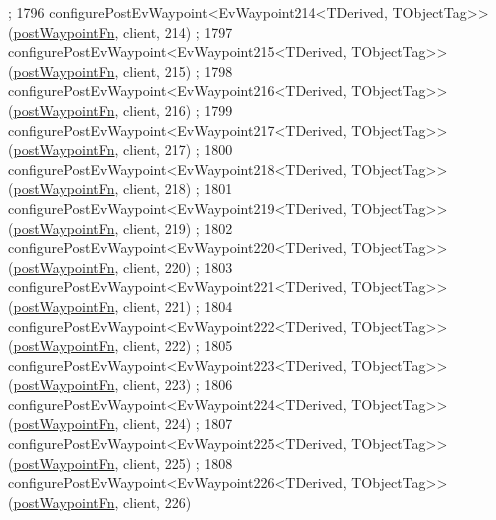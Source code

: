 \begin{DoxyCode}
      ;
1796     configurePostEvWaypoint<EvWaypoint214<TDerived, TObjectTag>>(\hyperlink{classmove__base__z__client_1_1WaypointEventDispatcher_acc538eb7506c13f7cca2268a1742dadd}{postWaypointFn}, client, 214)
      ;
1797     configurePostEvWaypoint<EvWaypoint215<TDerived, TObjectTag>>(\hyperlink{classmove__base__z__client_1_1WaypointEventDispatcher_acc538eb7506c13f7cca2268a1742dadd}{postWaypointFn}, client, 215)
      ;
1798     configurePostEvWaypoint<EvWaypoint216<TDerived, TObjectTag>>(\hyperlink{classmove__base__z__client_1_1WaypointEventDispatcher_acc538eb7506c13f7cca2268a1742dadd}{postWaypointFn}, client, 216)
      ;
1799     configurePostEvWaypoint<EvWaypoint217<TDerived, TObjectTag>>(\hyperlink{classmove__base__z__client_1_1WaypointEventDispatcher_acc538eb7506c13f7cca2268a1742dadd}{postWaypointFn}, client, 217)
      ;
1800     configurePostEvWaypoint<EvWaypoint218<TDerived, TObjectTag>>(\hyperlink{classmove__base__z__client_1_1WaypointEventDispatcher_acc538eb7506c13f7cca2268a1742dadd}{postWaypointFn}, client, 218)
      ;
1801     configurePostEvWaypoint<EvWaypoint219<TDerived, TObjectTag>>(\hyperlink{classmove__base__z__client_1_1WaypointEventDispatcher_acc538eb7506c13f7cca2268a1742dadd}{postWaypointFn}, client, 219)
      ;
1802     configurePostEvWaypoint<EvWaypoint220<TDerived, TObjectTag>>(\hyperlink{classmove__base__z__client_1_1WaypointEventDispatcher_acc538eb7506c13f7cca2268a1742dadd}{postWaypointFn}, client, 220)
      ;
1803     configurePostEvWaypoint<EvWaypoint221<TDerived, TObjectTag>>(\hyperlink{classmove__base__z__client_1_1WaypointEventDispatcher_acc538eb7506c13f7cca2268a1742dadd}{postWaypointFn}, client, 221)
      ;
1804     configurePostEvWaypoint<EvWaypoint222<TDerived, TObjectTag>>(\hyperlink{classmove__base__z__client_1_1WaypointEventDispatcher_acc538eb7506c13f7cca2268a1742dadd}{postWaypointFn}, client, 222)
      ;
1805     configurePostEvWaypoint<EvWaypoint223<TDerived, TObjectTag>>(\hyperlink{classmove__base__z__client_1_1WaypointEventDispatcher_acc538eb7506c13f7cca2268a1742dadd}{postWaypointFn}, client, 223)
      ;
1806     configurePostEvWaypoint<EvWaypoint224<TDerived, TObjectTag>>(\hyperlink{classmove__base__z__client_1_1WaypointEventDispatcher_acc538eb7506c13f7cca2268a1742dadd}{postWaypointFn}, client, 224)
      ;
1807     configurePostEvWaypoint<EvWaypoint225<TDerived, TObjectTag>>(\hyperlink{classmove__base__z__client_1_1WaypointEventDispatcher_acc538eb7506c13f7cca2268a1742dadd}{postWaypointFn}, client, 225)
      ;
1808     configurePostEvWaypoint<EvWaypoint226<TDerived, TObjectTag>>(\hyperlink{classmove__base__z__client_1_1WaypointEventDispatcher_acc538eb7506c13f7cca2268a1742dadd}{postWaypointFn}, client, 226)

\end{DoxyCode}
